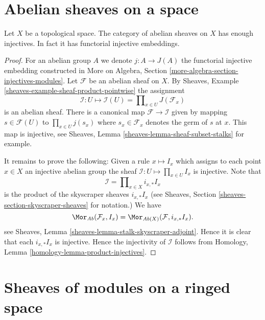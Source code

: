 \section{Abelian sheaves on a space}
\label{section-abelian-sheaves-space}


\begin{lemma}
\label{lemma-abelian-sheaves-space}
Let $X$ be a topological space.
The category of abelian sheaves on $X$ has enough injectives.
In fact it has functorial injective embeddings.
\end{lemma}

\begin{proof}
For an abelian group $A$ we denote $j : A \to J(A)$ the functorial
injective embedding constructed in
More on Algebra, Section \ref{more-algebra-section-injectives-modules}.
Let $\mathcal{F}$ be an abelian sheaf on $X$.
By Sheaves, Example \ref{sheaves-example-sheaf-product-pointwise}
the assignment
$$
\mathcal{I} : U \mapsto
\mathcal{I}(U) = \prod\nolimits_{x\in U} J(\mathcal{F}_x)
$$
is an abelian sheaf. There is a canonical map $\mathcal{F} \to \mathcal{I}$
given by mapping $s \in \mathcal{F}(U)$ to $\prod_{x \in U} j(s_x)$
where $s_x \in \mathcal{F}_x$ denotes the germ of $s$ at $x$.
This map is injective, see
Sheaves, Lemma \ref{sheaves-lemma-sheaf-subset-stalks}
for example.

\medskip\noindent
It remains to prove the following: Given a rule
$x \mapsto I_x$ which assigns to each point $x \in X$ an injective
abelian group the sheaf $\mathcal{I} : U \mapsto \prod_{x \in U} I_x$
is injective. Note that
$$
\mathcal{I} = \prod\nolimits_{x \in X} i_{x, *}I_x
$$
is the product of the skyscraper sheaves $i_{x, *}I_x$ (see
Sheaves, Section \ref{sheaves-section-skyscraper-sheaves} for notation.)
We have
$$
\Mor_{\textit{Ab}}(\mathcal{F}_x, I_x)
=
\Mor_{\textit{Ab}(X)}(\mathcal{F}, i_{x, *}I_x).
$$
see Sheaves, Lemma \ref{sheaves-lemma-stalk-skyscraper-adjoint}. Hence it is
clear that each $i_{x, *}I_x$ is injective. Hence the injectivity of
$\mathcal{I}$ follows from
Homology, Lemma \ref{homology-lemma-product-injectives}.
\end{proof}









\section{Sheaves of modules on a ringed space}
\label{section-sheaves-modules-space}


